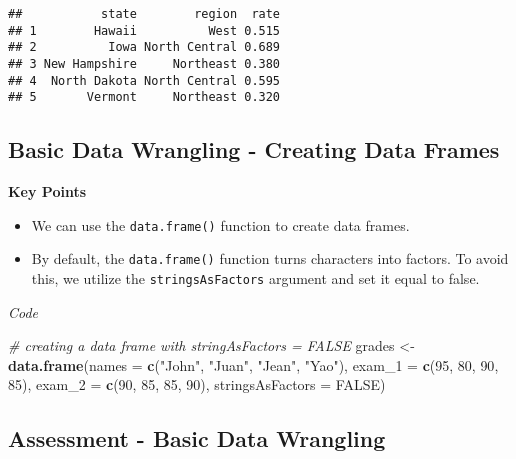 \documentclass[]{article}
\newenvironment{Shaded}{\begin{snugshade}}{\end{snugshade}}
\newcommand{\CommentTok}[1]{\textcolor[rgb]{0.56,0.35,0.01}{\textit{#1}}}
\newcommand{\DataTypeTok}[1]{\textcolor[rgb]{0.13,0.29,0.53}{#1}}
\newcommand{\DecValTok}[1]{\textcolor[rgb]{0.00,0.00,0.81}{#1}}
\newcommand{\KeywordTok}[1]{\textcolor[rgb]{0.13,0.29,0.53}{\textbf{#1}}}
\newcommand{\NormalTok}[1]{#1}
\newcommand{\OtherTok}[1]{\textcolor[rgb]{0.56,0.35,0.01}{#1}}
\newcommand{\StringTok}[1]{\textcolor[rgb]{0.31,0.60,0.02}{#1}}
\providecommand{\tightlist}{%
  \setlength{\itemsep}{0pt}\setlength{\parskip}{0pt}}
\begin{document}
\begin{verbatim}
##           state        region  rate
## 1        Hawaii          West 0.515
## 2          Iowa North Central 0.689
## 3 New Hampshire     Northeast 0.380
## 4  North Dakota North Central 0.595
## 5       Vermont     Northeast 0.320
\end{verbatim}

\hypertarget{basic-data-wrangling---creating-data-frames}{%
\subsection{Basic Data Wrangling - Creating Data
Frames}\label{basic-data-wrangling---creating-data-frames}}

\textbf{Key Points}

\begin{itemize}
\tightlist
\item
  We can use the \texttt{data.frame()} function to create data frames.
\item
  By default, the \texttt{data.frame()} function turns characters into
  factors. To avoid this, we utilize the \texttt{stringsAsFactors}
  argument and set it equal to false.
\end{itemize}

\emph{Code}

\begin{Shaded}
\begin{Highlighting}[]
\CommentTok{# creating a data frame with stringAsFactors = FALSE}
\NormalTok{grades <-}\StringTok{ }\KeywordTok{data.frame}\NormalTok{(}\DataTypeTok{names =} \KeywordTok{c}\NormalTok{(}\StringTok{"John"}\NormalTok{, }\StringTok{"Juan"}\NormalTok{, }\StringTok{"Jean"}\NormalTok{, }\StringTok{"Yao"}\NormalTok{), }
                     \DataTypeTok{exam_1 =} \KeywordTok{c}\NormalTok{(}\DecValTok{95}\NormalTok{, }\DecValTok{80}\NormalTok{, }\DecValTok{90}\NormalTok{, }\DecValTok{85}\NormalTok{), }
                     \DataTypeTok{exam_2 =} \KeywordTok{c}\NormalTok{(}\DecValTok{90}\NormalTok{, }\DecValTok{85}\NormalTok{, }\DecValTok{85}\NormalTok{, }\DecValTok{90}\NormalTok{),}
                     \DataTypeTok{stringsAsFactors =} \OtherTok{FALSE}\NormalTok{)}
\end{Highlighting}
\end{Shaded}

\hypertarget{assessment---basic-data-wrangling}{%
\subsection{Assessment - Basic Data
Wrangling}\label{assessment---basic-data-wrangling}}
\end{document}
